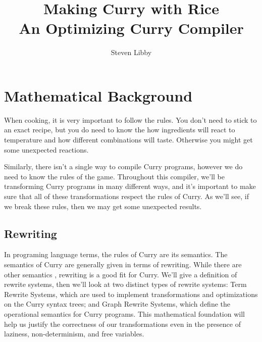 \documentclass{book}
\title{Making Curry with Rice \\
       \large{An Optimizing Curry Compiler}}
\author{Steven Libby}
\theoremstyle{definition}
\begin{document}
\maketitle

\tableofcontents

\chapter{Mathematical Background}


When cooking, it is very important to follow the rules.
You don't need to stick to an exact recipe, 
but you do need to know the how ingredients will react to temperature
and how different combinations will taste.
Otherwise you might get some unexpected reactions.

Similarly, there isn't a single way to compile Curry programs,
however we do need to know the rules of the game.
Throughout this compiler, we'll be transforming Curry programs
in many different ways, and it's important to make sure that all
of these transformations respect the rules of Curry.
As we'll see, if we break these rules, 
then we may get some unexpected results.

\section{Rewriting}
In programing language terms, the rules of Curry are its semantics.
The semantics of Curry are generally given in terms of rewriting.
\cite{IntegrationFunLog, FunLog, Needed}
While there are other semantics \cite{currySemantics, crwl, monadSemantics}, 
rewriting is a good fit for Curry.
We'll give a definition of rewrite systems,
then we'll look at two distinct types of rewrite systems:
Term Rewrite Systems, which are used to implement transformations and optimizations
on the Curry syntax trees;
and Graph Rewrite Systems, which define the operational semantics for Curry programs.
This mathematical foundation will help us justify the correctness of our transformations
even in the presence of laziness, non-determinism, and free variables.
\end{document}
